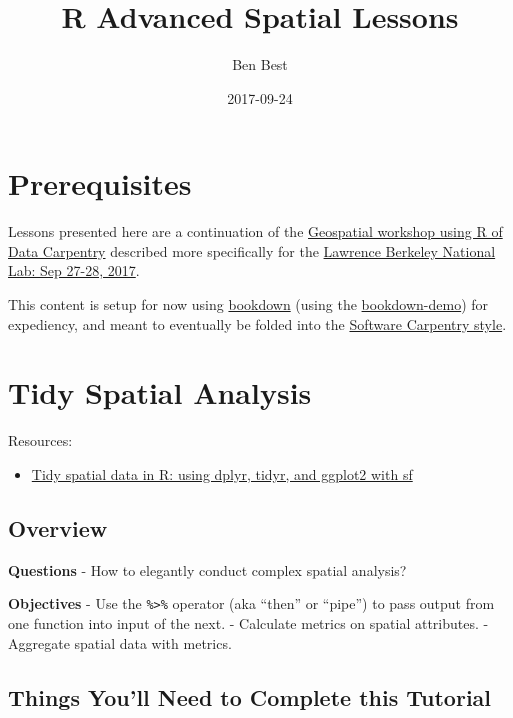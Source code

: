 \documentclass[]{book}
\title{R Advanced Spatial Lessons}
\author{Ben Best}
\date{2017-09-24}
\providecommand{\tightlist}{%
  \setlength{\itemsep}{0pt}\setlength{\parskip}{0pt}}
\begin{document}
\maketitle

{
\setcounter{tocdepth}{1}
\tableofcontents
}
\chapter*{Prerequisites}\label{prereq}

Lessons presented here are a continuation of the
\href{http://www.datacarpentry.org/lessons/\#geospatial-data-workshop}{Geospatial
workshop using R of Data Carpentry} described more specifically for the
\href{https://jsta.github.io/2017-09-27-LBNL/}{Lawrence Berkeley
National Lab: Sep 27-28, 2017}.

This content is setup for now using
\href{http://bookdown.org/yihui/bookdown}{bookdown} (using the
\href{https://github.com/rstudio/bookdown-demo}{bookdown-demo}) for
expediency, and meant to eventually be folded into the
\href{https://github.com/swcarpentry/styles}{Software Carpentry style}.

\chapter{Tidy Spatial Analysis}\label{tidy}

Resources:

\begin{itemize}
\tightlist
\item
  \href{http://strimas.com/r/tidy-sf/}{Tidy spatial data in R: using
  dplyr, tidyr, and ggplot2 with sf}
\end{itemize}

\section{Overview}\label{overview}

\textbf{Questions} - How to elegantly conduct complex spatial analysis?

\textbf{Objectives} - Use the \texttt{\%\textgreater{}\%} operator (aka
``then'' or ``pipe'') to pass output from one function into input of the
next. - Calculate metrics on spatial attributes. - Aggregate spatial
data with metrics.

\section{Things You'll Need to Complete this
Tutorial}\label{things-youll-need-to-complete-this-tutorial}
\end{document}
